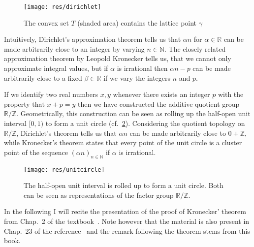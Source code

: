 \begin{figure}
  \begin{center}
    \texttt{[image: res/dirichlet]}
    \caption{The convex set \(T\) (shaded area) contains the lattice point
             \(γ\)}
    \label{fig:dirichlet}
  \end{center}
\end{figure}

Intuitively, Dirichlet's approximation theorem tells us that \(α n\) for \(α ∈
ℝ\) can be made arbitrarily close to an integer by varying \(n ∈ ℕ\). The
closely related approximation theorem by Leopold Kronecker tells us, that we
cannot only approximate integral values, but if \(α\) is irrational then \(α n -
p\) can be made arbitrarily close to a fixed \(β ∈ ℝ\) if we vary the integers
\(n\) and \(p\).

If we identify two real numbers \(x, y\) whenever there exists an integer \(p\)
with the property that \(x + p = y\) then we have constructed the additive
quotient group \(ℝ / ℤ\). Geometrically, this construction can be seen as
rolling up the half-open unit interval \([0, 1)\) to form a unit circle
(cf.~\cref{fig:unitcircle}). Considering the quotient topology on \(ℝ / ℤ\),
Dirichlet's theorem tells us that \(α n\) can be made arbitrarily close to \(0
+ ℤ\), while Kronecker's theorem states that every point of the unit circle is a
cluster point of the sequence \((α n)_{n ∈ ℕ}\) if \(α\) is irrational.

\begin{figure}
  \begin{center}
    \texttt{[image: res/unitcircle]}
    \caption{The half-open unit interval is rolled up to form a unit circle.
             Both can be seen as representations of the factor group \(ℝ/ℤ\).}%
    \label{fig:unitcircle}
  \end{center}
\end{figure}

In the following I will recite the presentation of the proof of Kronecker'
theorem from Chap.~2 of the textbook~\cite{Hlawka1991}. Note however that the
material is also present in Chap.~23 of the reference~\cite{Hardy1975} and the
remark following the theorem stems from this book.

